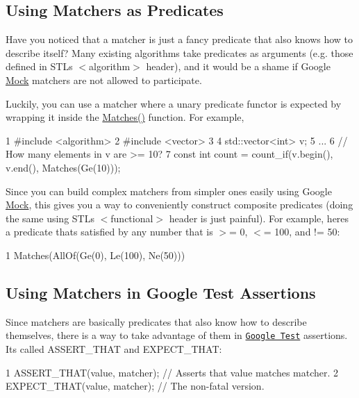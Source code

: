 \subsection*{Using Matchers as Predicates}

Have you noticed that a matcher is just a fancy predicate that also knows how to describe itself? Many existing algorithms take predicates as arguments (e.\+g. those defined in S\+TL\textquotesingle{}s {\ttfamily $<$algorithm$>$} header), and it would be a shame if Google \hyperlink{classMock}{Mock} matchers are not allowed to participate.

Luckily, you can use a matcher where a unary predicate functor is expected by wrapping it inside the {\ttfamily \hyperlink{namespacetesting_ad53b509ae9cd51040d67f668f99702ae}{Matches()}} function. For example,


\begin{DoxyCode}
1 #include <algorithm>
2 #include <vector>
3 
4 std::vector<int> v;
5 ...
6 // How many elements in v are >= 10?
7 const int count = count\_if(v.begin(), v.end(), Matches(Ge(10)));
\end{DoxyCode}


Since you can build complex matchers from simpler ones easily using Google \hyperlink{classMock}{Mock}, this gives you a way to conveniently construct composite predicates (doing the same using S\+TL\textquotesingle{}s {\ttfamily $<$functional$>$} header is just painful). For example, here\textquotesingle{}s a predicate that\textquotesingle{}s satisfied by any number that is $>$= 0, $<$= 100, and != 50\+:


\begin{DoxyCode}
1 Matches(AllOf(Ge(0), Le(100), Ne(50)))
\end{DoxyCode}


\subsection*{Using Matchers in Google Test Assertions}

Since matchers are basically predicates that also know how to describe themselves, there is a way to take advantage of them in \href{http://code.google.com/p/googletest/}{\tt Google Test} assertions. It\textquotesingle{}s called {\ttfamily A\+S\+S\+E\+R\+T\+\_\+\+T\+H\+AT} and {\ttfamily E\+X\+P\+E\+C\+T\+\_\+\+T\+H\+AT}\+:


\begin{DoxyCode}
1 ASSERT\_THAT(value, matcher);  // Asserts that value matches matcher.
2 EXPECT\_THAT(value, matcher);  // The non-fatal version.
\end{DoxyCode}


